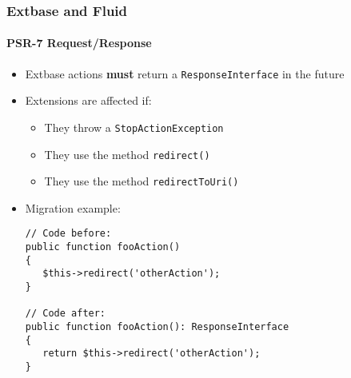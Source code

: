 %

\begin{frame}[fragile]
	\frametitle{Extbase and Fluid}
	\framesubtitle{PSR-7 Request/Response}


	\begin{itemize}
		\item Extbase actions \textbf{must} return a \texttt{ResponseInterface}
			in the future
		\item Extensions are affected if:
			\begin{itemize}
				\item They throw a \texttt{StopActionException}
				\item They use the method \texttt{redirect()}
				\item They use the method \texttt{redirectToUri()}
			\end{itemize}
		\item Migration example:
\begin{lstlisting}
// Code before:
public function fooAction()
{
   $this->redirect('otherAction');
}

// Code after:
public function fooAction(): ResponseInterface
{
   return $this->redirect('otherAction');
}
\end{lstlisting}

	\end{itemize}

\end{frame}

